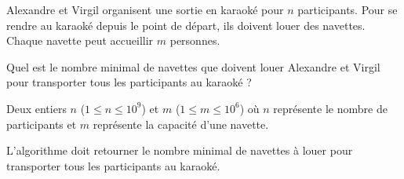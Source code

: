 \problemname{\problemyamlname}


Alexandre et Virgil organisent une sortie en karaoké pour $n$ participants.
Pour se rendre au karaoké depuis le point de départ, ils doivent louer des navettes. Chaque navette peut accueillir $m$ personnes.

Quel est le nombre minimal de navettes que doivent louer Alexandre et Virgil pour transporter tous les participants au karaoké ?

\begin{Input}
	Deux entiers $n$ ($1 \le n \le 10^9$) et $m$ ($1 \le m \le 10^6$) où $n$ représente le nombre de participants et $m$ représente la capacité d'une navette.
\end{Input}

\begin{Output}
	L'algorithme doit retourner le nombre minimal de navettes à louer pour transporter tous les participants au karaoké.
\end{Output}
